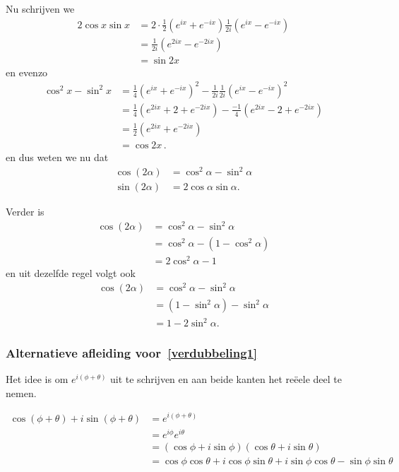 Nu schrijven we
\begin{align*}
    2 \cos x \sin x &= 2 \cdot \frac 1 2 \left( e^{i x} + e^{-ix} \right) \frac 1 {2i} \left( e^{ix} - e^{-ix} \right) \\
    &= \frac 1 {2i} \left(e^{2 i x} - e^{-2ix} \right) \\
    &= \sin 2 x
\end{align*}
en evenzo
\begin{align*}
    \cos^2 x - \sin^2 x &= \frac 1 4 \left( e^{ix} + e^{-ix} \right)^2 - \frac 1 {2i} \frac 1 {2i} \left( e^{ix} - e^{-ix} \right)^2 \\
    &= \frac 1 4 \left( e^{2ix} + 2 + e^{-2ix} \right) - \frac {-1} {4} \left( e^{2ix} - 2 + e^{-2ix} \right) \\
    &= \frac {1} {2} \left( e^{2ix} + e^{-2ix} \right) \\
    &= \cos 2x \,.
\end{align*}
en dus weten we nu dat
\begin{align}
    \label{verdubbeling1}
    \cos (2\alpha) &= \cos^2 \alpha - \sin^2 \alpha  \\
    \sin (2\alpha) &= 2 \cos \alpha \sin \alpha. \label{verdubbeling2}
\end{align}


Verder is
\begin{align*}
    \cos (2 \alpha) &= \cos^2 \alpha - \sin^2 \alpha \\
    &= \cos^2 \alpha - (1 - \cos^2 \alpha ) \\
    &= 2  \cos^2 \alpha - 1
\end{align*}
en uit dezelfde regel volgt ook
\begin{align*}
    \cos (2 \alpha) &= \cos^2 \alpha - \sin^2 \alpha \\
    &= (1 - \sin^2 \alpha) - \sin^2 \alpha \\
    &= 1 - 2 \sin^2 \alpha .
\end{align*}

\subsubsection{Alternatieve afleiding voor~\eqref{verdubbeling1}}

Het idee is om $e^{i(\phi + \theta)}$ uit te schrijven en aan beide kanten het re\"eele deel te nemen.

\begin{align*}
    \cos(\phi + \theta) + i \sin(\phi + \theta) &= e^{i(\phi + \theta)} \\
    &= e^{i\phi} e^{i \theta} \\
    &= (\cos \phi + i \sin \phi )(\cos \theta + i \sin \theta) \\
    &= \cos \phi \cos \theta + i \cos \phi \sin \theta + i \sin \phi \cos \theta - \sin \phi \sin \theta \\
\end{align*}

